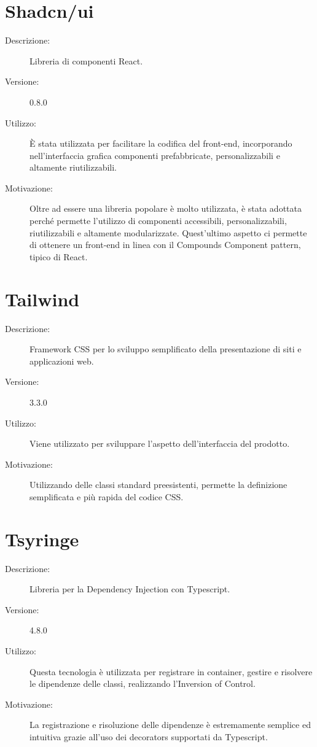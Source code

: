 \section{Shadcn/ui}
\begin{description}
\item[Descrizione:] Libreria di componenti React.
\item[Versione:] 0.8.0
\item[Utilizzo:] È stata utilizzata per facilitare la codifica del front-end, incorporando nell'interfaccia grafica componenti prefabbricate, personalizzabili e altamente riutilizzabili.
\item[Motivazione:] Oltre ad essere una libreria popolare è molto utilizzata, è stata adottata perché permette l'utilizzo di componenti accessibili, personalizzabili, riutilizzabili e altamente modularizzate. Quest'ultimo aspetto ci permette di ottenere un front-end in linea con il Compounds Component pattern, tipico di React.
\end{description}

\section{Tailwind}
\begin{description}
\item[Descrizione:] Framework CSS per lo sviluppo semplificato della presentazione di siti e applicazioni web.
\item[Versione:] 3.3.0
\item[Utilizzo:] Viene utilizzato per sviluppare l'aspetto dell'interfaccia del prodotto.
\item[Motivazione:] Utilizzando delle classi standard preesistenti, permette la definizione semplificata e più rapida del codice CSS.
\end{description}

\section{Tsyringe}
\begin{description}
\item[Descrizione:] Libreria per la Dependency Injection con Typescript.
\item[Versione:] 4.8.0
\item[Utilizzo:] Questa tecnologia è utilizzata per registrare in container, gestire e risolvere le dipendenze delle classi, realizzando l'Inversion of Control.
\item[Motivazione:] La registrazione e risoluzione delle dipendenze è estremamente semplice ed intuitiva grazie all'uso dei decorators supportati da Typescript.
\end{description}

